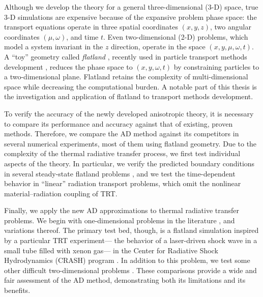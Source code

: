 Although we develop the theory for a general three-dimensional (3-D) space,
true \mbox{3-D} simulations are expensive because of the expansive problem phase
space: the transport equations operate in three spatial coordinates $(x,y,z)$,
two angular coordinates $(\mu,\omega)$, and time $t$. Even two-dimensional (2-D)
problems, which model a system invariant in the $z$ direction, operate in the
space $(x,y,\mu,\omega,t)$. A ``toy'' geometry called \emph{flatland}
\cite{Abb1884}, recently used in particle transport methods development
\cite{Asa2008,Lar2009c},
reduces the phase space to $(x,y,\omega,t)$ by constraining particles to a
two-dimensional plane. Flatland retains the complexity of multi-dimensional
space while decreasing the computational burden. A notable part of this thesis
is the investigation and application of flatland to transport methods
development.

To verify the accuracy of the newly developed anisotropic theory, it is
necessary to
compare its performance and accuracy against that of existing, proven methods.
Therefore, we compare the AD method against its competitors in several numerical
experiments, most of them using flatland geometry. Due to the complexity of
the thermal radiative transfer process, we first test individual aspects of the
theory. In particular, we verify the predicted boundary conditions in several
steady-state flatland problems \cite{Joh2011a}, and we test the time-dependent
behavior in ``linear'' radiation transport problems, which omit the nonlinear
material--radiation coupling of TRT.

Finally, we apply the new AD approximations to thermal radiative transfer
problems. We begin with
one-dimensional problems in the literature \cite{Rau2005}, and variations
thereof. The primary test bed, though, is a flatland simulation
\cite{Joh2011} inspired by a particular TRT experiment---%
the behavior of a laser-driven shock wave in a small tube filled with xenon
gas---%
in the Center for Radiative Shock Hydrodynamics (CRASH) program
\cite{Crash2010}. In addition to this problem, we test some other difficult
two-dimensional problems \cite{Mou2006}. These comparisons provide a wide and
fair assessment of the AD method, demonstrating both its limitations and its
benefits.


